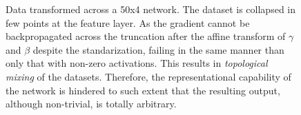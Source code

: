 \begin{figure}[h!]
{{    %
    }
    \parbox{.195\textwidth}{%
    }
  }
  \caption{Data transformed across a 50x4 \ReLUBN network. The dataset is collapsed in few points at the feature layer. As the gradient cannot be backpropagated across the truncation after the affine transform of $\gamma$ and $\beta$ despite the standarization, failing in the same manner than \ReLU only that with non-zero activations. This results in \emph{topological mixing} of the datasets. Therefore, the representational capability of the network is hindered to such extent that the resulting output, although non-trivial, is totally arbitrary.}
    \label{fig:moonsReLUBN}
\end{figure}


